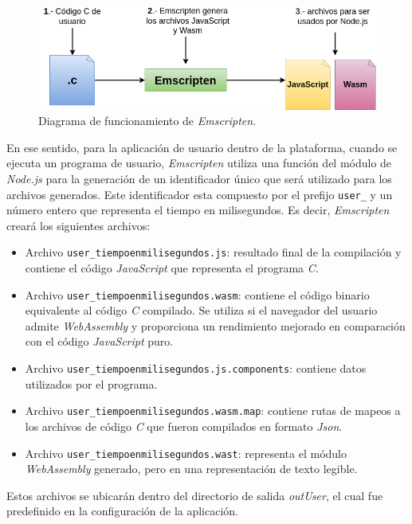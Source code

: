 \begin{figure}[ht]
	\centering
	\includegraphics[scale=.47]{./Figures/Emscripten.png}
	\caption{Diagrama de funcionamiento de \textit{Emscripten}.}
	\label{fig:Emscripten}
\end{figure}


En ese sentido, para la aplicación de usuario dentro de la plataforma, cuando se ejecuta un programa de usuario, \textit{Emscripten} utiliza una función del módulo de \textit{Node.js} para la generación de un identificador único que será utilizado para los archivos generados. Este identificador esta compuesto por el prefijo \texttt{user\_} y un número entero que representa el tiempo en milisegundos. Es decir, \textit{Emscripten} creará los siguientes archivos:

\begin{itemize}

	\item Archivo \texttt{user\_tiempoenmilisegundos.js}: resultado final de la compilación y contiene el código \textit{JavaScript} que representa el programa \textit{C}.
	\item Archivo \texttt{user\_tiempoenmilisegundos.wasm}: contiene el código binario equivalente al código \textit{C} compilado. Se utiliza si el navegador del usuario admite \textit{WebAssembly} y proporciona un rendimiento mejorado en comparación con el código \textit{JavaScript} puro.
	\item Archivo \texttt{user\_tiempoenmilisegundos.js.components}: contiene datos utilizados por el programa.
	\item Archivo \texttt{user\_tiempoenmilisegundos.wasm.map}: contiene rutas de mapeos a los archivos de código \textit{C} que fueron compilados en formato \textit{Json}.
	\item Archivo \texttt{user\_tiempoenmilisegundos.wast}: representa el módulo \textit{WebAssembly} generado, pero en una representación de texto legible.
\end{itemize}

Estos archivos se ubicarán dentro del directorio de salida  \textit{outUser}, el cual fue predefinido en la configuración de la aplicación.


